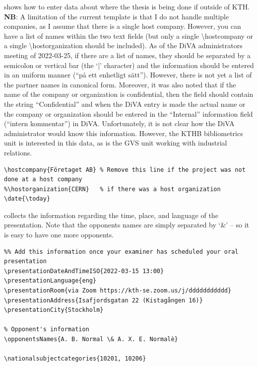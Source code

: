  shows how to enter data about where the thesis is being done if outside of KTH.
\textbf{NB}: A limitation of the current template is that I do not handle multiple companies, as I assume that there is a single host company. However, you can have a list of names within the two text fields (but only a single \textbackslash hostcompany or a single \textbackslash hostorganization should be included). As of the DiVA administrators meeting of 2022-03-25, if there are a list of names, they should be separated by a semicolon or vertical bar (\ie the `|' character) and the information should be entered in an uniform manner (\ie ``på ett enhetligt sätt''). However, there is not yet a list of the partner names in canonical form. Moreover, it was also noted that if the name of the company or organization is confidential, then the field should contain the string ``Confidential'' and when the DiVA entry is made the actual name or the company or organization should be entered in the ``Internal'' information field (\ie ``intern kommentar'') in DiVA. Unfortunately, it is not clear how the DiVA administrator would know this information. However, 
the KTHB bibliometrics unit is interested in this data, as is the GVS unit working with industrial relations.
\begin{lstlisting}[language={[LaTeX]TeX}, caption={Information about where the thesis is taking place}, label=lst:hostcompany] 
\hostcompany{Företaget AB} % Remove this line if the project was not done at a host company
%\hostorganization{CERN}   % if there was a host organization
\date{\today}
\end{lstlisting}
 collects the information regarding the time, place, and language of the presentation. Note that the opponents names are simply separated by ‘\&’ – so it is easy to have one more opponents.
\ifxeorlua
\begin{lstlisting}[language={[LaTeX]TeX}, caption={Information relevant to the oral presentation (both the location and the opponent or opponents)}, label=lst:oralpresentatioOpponents] 
%%%%% For the oral presentation
%% Add this information once your examiner has scheduled your oral presentation
\presentationDateAndTimeISO{2022-03-15 13:00}
\presentationLanguage{eng}
\presentationRoom{via Zoom https://kth-se.zoom.us/j/ddddddddddd}
\presentationAddress{Isafjordsgatan 22 (Kistagången 16)}
\presentationCity{Stockholm}

% Opponent's information
\opponentsNames{A. B. Normal \& A. X. E. Normalè}

\nationalsubjectcategories{10201, 10206}
\end{lstlisting}
